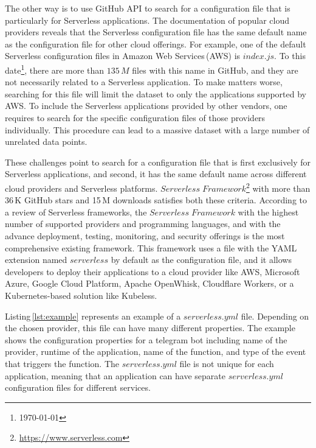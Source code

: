 The other way is to use GitHub API to search for a configuration file that is 
particularly for Serverless applications. The documentation of popular cloud 
providers reveals that the Serverless configuration file has the same default 
name as the configuration file for other cloud offerings. 
For example, one of the default Serverless configuration files in Amazon 
Web Services\,(AWS) is $index.js$. To this date\footnote{\today}, there 
are more than $135 \, M$ files with this name in GitHub, and they are not 
necessarily related to a Serverless application. To make matters worse, 
searching for this file will limit the dataset to only the applications supported 
by AWS. To include the Serverless applications provided by other vendors, 
one requires to search for the specific configuration files of those providers 
individually. This procedure can lead to a massive dataset with a large number 
of unrelated data points.

These challenges point to search for a configuration file that is first exclusively 
for Serverless applications, and second, it has the same default name across 
different cloud providers and Serverless platforms. 
$Serverless \; Framework$\footnote{\url{https://www.serverless.com}} 
with more than 36\,K GitHub stars and 15\,M downloads satisfies both these 
criteria. According to a review of Serverless frameworks\cite{kritikos2018review}, 
the $Serverless \; Framework$ with the highest number of supported providers 
and programming languages, and with the advance deployment, testing, 
monitoring, and security offerings is the most comprehensive existing framework. 
This framework uses a file with the YAML extension named $serverless$ 
by default as the configuration file, and it allows developers to deploy their 
applications to a cloud provider like AWS, Microsoft Azure, Google Cloud 
Platform, Apache OpenWhisk, Cloudflare Workers, or a Kubernetes-based 
solution like Kubeless.

Listing\,\ref{lst:example} represents an example of a $serverless.yml$ file. 
Depending on the chosen provider, this file can have many different properties.
The example shows the configuration properties for a telegram bot including 
name of the provider, runtime of the application, name of the function, 
and type of the event that triggers the function. The $serverless.yml$ file is 
not unique for each application, meaning that an application can have separate
$serverless.yml$ configuration files for different services.

\vspace{2mm}


